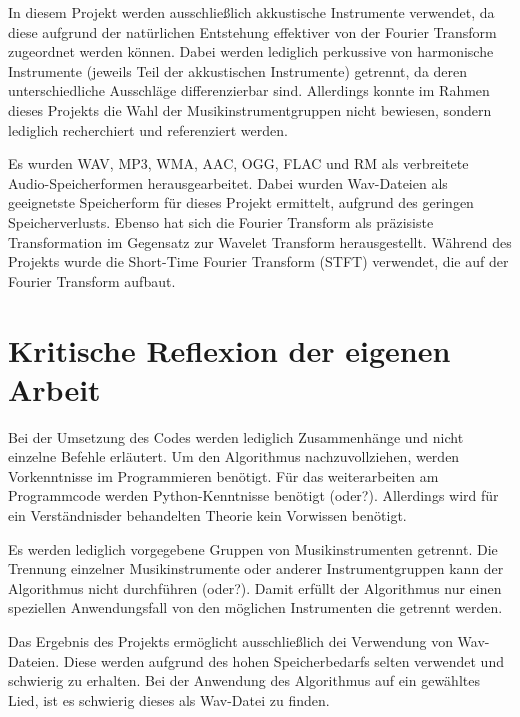 \par

In diesem Projekt werden ausschließlich akkustische Instrumente verwendet, da diese aufgrund der natürlichen Entstehung effektiver von der Fourier Transform zugeordnet werden können.
Dabei werden lediglich perkussive von harmonische Instrumente (jeweils Teil der akkustischen Instrumente) getrennt, da deren unterschiedliche Ausschläge differenzierbar sind.
Allerdings konnte im Rahmen dieses Projekts die Wahl der Musikinstrumentgruppen nicht bewiesen, sondern lediglich recherchiert und referenziert werden.

\par

Es wurden WAV, MP3, WMA, AAC, OGG, FLAC und RM als verbreitete Audio-Speicherformen herausgearbeitet.
Dabei wurden Wav-Dateien als geeignetste Speicherform für dieses Projekt ermittelt, aufgrund des geringen Speicherverlusts.
Ebenso hat sich die Fourier Transform als präzisiste Transformation im Gegensatz zur Wavelet Transform herausgestellt.
Während des Projekts wurde die Short-Time Fourier Transform (STFT) verwendet, die auf der Fourier Transform aufbaut.

%
\section{Kritische Reflexion der eigenen Arbeit}
%

Bei der Umsetzung des Codes werden lediglich Zusammenhänge und nicht einzelne Befehle erläutert.
Um den Algorithmus nachzuvollziehen, werden Vorkenntnisse im Programmieren benötigt.
Für das weiterarbeiten am Programmcode werden Python-Kenntnisse benötigt (oder?).
Allerdings wird für ein Verständnisder behandelten Theorie kein Vorwissen benötigt.

\par

Es werden lediglich vorgegebene Gruppen von Musikinstrumenten getrennt.
Die Trennung einzelner Musikinstrumente oder anderer Instrumentgruppen kann der Algorithmus nicht durchführen (oder?).
Damit erfüllt der Algorithmus nur einen speziellen Anwendungsfall von den möglichen Instrumenten die getrennt werden.

\par

Das Ergebnis des Projekts ermöglicht ausschließlich dei Verwendung von Wav-Dateien.
Diese werden aufgrund des hohen Speicherbedarfs selten verwendet und schwierig zu erhalten.
Bei der Anwendung des Algorithmus auf ein gewähltes Lied, ist es schwierig dieses als Wav-Datei zu finden.

